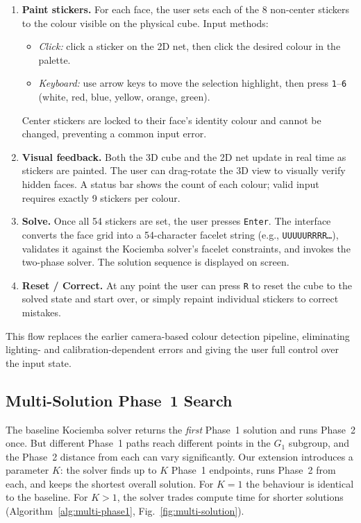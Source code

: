 \documentclass[graybox]{svmult}
\begin{document}
\begin{enumerate}[leftmargin=*]
  \item \textbf{Paint stickers.} For each face, the user sets each of the 8 non-center stickers to the colour visible on the physical cube. Input methods:
  \begin{itemize}
    \item \emph{Click:} click a sticker on the 2D net, then click the desired colour in the palette.
    \item \emph{Keyboard:} use arrow keys to move the selection highlight, then press \texttt{1}--\texttt{6} (white, red, blue, yellow, orange, green).
  \end{itemize}
  Center stickers are locked to their face's identity colour and cannot be changed, preventing a common input error.

  \item \textbf{Visual feedback.} Both the 3D cube and the 2D net update in real time as stickers are painted. The user can drag-rotate the 3D view to visually verify hidden faces. A status bar shows the count of each colour; valid input requires exactly 9 stickers per colour.

  \item \textbf{Solve.} Once all 54 stickers are set, the user presses \texttt{Enter}. The interface converts the face grid into a 54-character facelet string (e.g., \texttt{UUUUURRRR\ldots}), validates it against the Kociemba solver's facelet constraints, and invokes the two-phase solver. The solution sequence is displayed on screen.

  \item \textbf{Reset / Correct.} At any point the user can press \texttt{R} to reset the cube to the solved state and start over, or simply repaint individual stickers to correct mistakes.
\end{enumerate}

This flow replaces the earlier camera-based colour detection pipeline, eliminating lighting- and calibration-dependent errors and giving the user full control over the input state.

\subsection{Multi-Solution Phase~1 Search}
\label{sec:multi-phase1}

The baseline Kociemba solver returns the \emph{first} Phase~1 solution and runs Phase~2 once. But different Phase~1 paths reach different points in the $G_1$ subgroup, and the Phase~2 distance from each can vary significantly. Our extension introduces a parameter $K$: the solver finds up to $K$ Phase~1 endpoints, runs Phase~2 from each, and keeps the shortest overall solution. For $K{=}1$ the behaviour is identical to the baseline. For $K > 1$, the solver trades compute time for shorter solutions (Algorithm~\ref{alg:multi-phase1}, Fig.~\ref{fig:multi-solution}).
\end{document}
